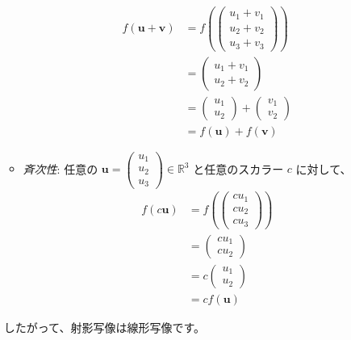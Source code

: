 \begin{ex}
\begin{enumerate}
\begin{itemize}
    \begin{align*}
    f(\bm{u}+\bm{v}) &= f\left(\begin{pmatrix} u_1+v_1 \\ u_2+v_2 \\ u_3+v_3 \end{pmatrix}\right) \\
    &= \begin{pmatrix} u_1+v_1 \\ u_2+v_2 \end{pmatrix} \\
    &= \begin{pmatrix} u_1 \\ u_2 \end{pmatrix} + \begin{pmatrix} v_1 \\ v_2 \end{pmatrix} \\
    &= f(\bm{u}) + f(\bm{v})
    \end{align*}
    \item \emph{斉次性}: 任意の $\bm{u}=\begin{pmatrix} u_1 \\ u_2 \\ u_3 \end{pmatrix} \in \mathbb{R}^3$ と任意のスカラー $c$ に対して、
    \begin{align*}
    f(c\bm{u}) &= f\left(\begin{pmatrix} cu_1 \\ cu_2 \\ cu_3 \end{pmatrix}\right) \\
    &= \begin{pmatrix} cu_1 \\ cu_2 \end{pmatrix} \\
    &= c\begin{pmatrix} u_1 \\ u_2 \end{pmatrix} \\
    &= cf(\bm{u})
    \end{align*}
    \end{itemize}
    したがって、射影写像は線形写像です。
\end{enumerate}
\end{ex}

